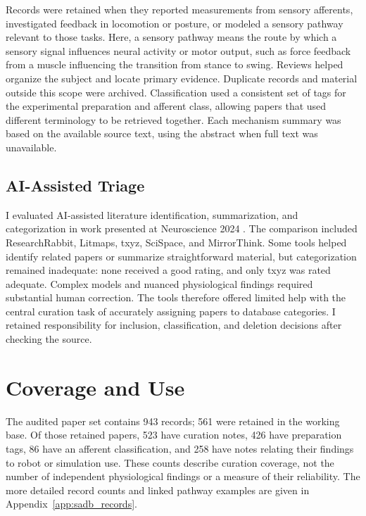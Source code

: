 Records were retained when they reported measurements from sensory afferents, investigated feedback in locomotion or posture, or modeled a sensory pathway relevant to those tasks. Here, a sensory pathway means the route by which a sensory signal influences neural activity or motor output, such as force feedback from a muscle influencing the transition from stance to swing. Reviews helped organize the subject and locate primary evidence. Duplicate records and material outside this scope were archived. Classification used a consistent set of tags for the experimental preparation and afferent class, allowing papers that used different terminology to be retrieved together. Each mechanism summary was based on the available source text, using the abstract when full text was unavailable.

\subsection{AI-Assisted Triage}\label{sec:sadb_triage}

I evaluated AI-assisted literature identification, summarization, and categorization in work presented at Neuroscience 2024 \citep{bolen_using_2024}. The comparison included ResearchRabbit, Litmaps, txyz, SciSpace, and MirrorThink. Some tools helped identify related papers or summarize straightforward material, but categorization remained inadequate: none received a good rating, and only txyz was rated adequate. Complex models and nuanced physiological findings required substantial human correction. The tools therefore offered limited help with the central curation task of accurately assigning papers to database categories. I retained responsibility for inclusion, classification, and deletion decisions after checking the source.

\section{Coverage and Use}\label{sec:sadb_corpus}

The audited paper set contains 943 records; 561 were retained in the working base. Of those retained papers, 523 have curation notes, 426 have preparation tags, 86 have an afferent classification, and 258 have notes relating their findings to robot or simulation use. These counts describe curation coverage, not the number of independent physiological findings or a measure of their reliability. The more detailed record counts and linked pathway examples are given in Appendix~\ref{app:sadb_records}.

